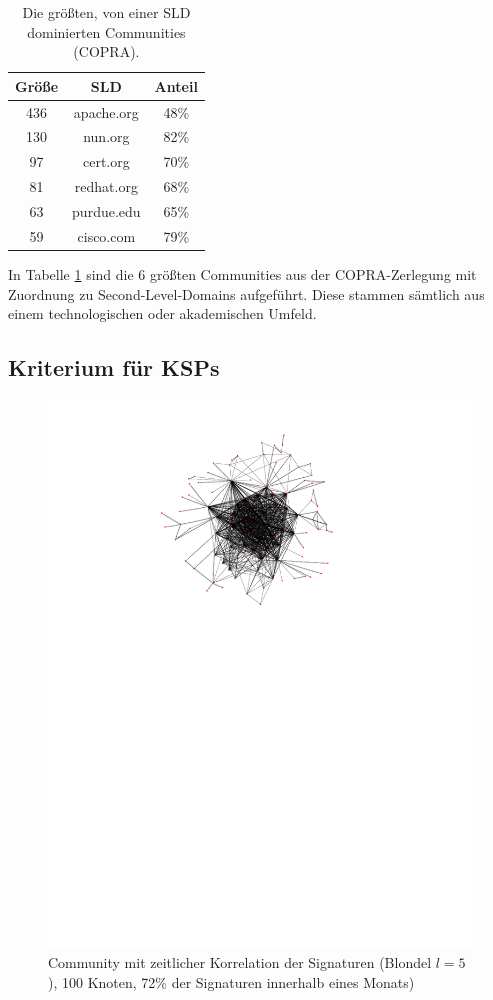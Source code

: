 \begin{table}
  \centering
  \begin{tabular}{c|c|c}
    Größe & SLD & Anteil \\
    \hline
    436 & apache.org & 48\% \\
    130 & nun.org & 82\% \\
    97 & cert.org & 70\% \\
    81 & redhat.org & 68\% \\
    63 & purdue.edu & 65\% \\
    59 & cisco.com & 79\% 
  \end{tabular}
  \caption{Die größten, von einer SLD dominierten Communities
    (COPRA).}
  \label{tab:ass-examples}
\end{table}
In Tabelle \ref{tab:ass-examples} sind die 6 größten Communities
aus der COPRA-Zerlegung mit Zuordnung zu Second-Level-Domains
aufgeführt. Diese stammen sämtlich aus einem technologischen oder
akademischen Umfeld.

\subsection{Kriterium für KSPs}
\label{sec:kriterium-fur-ksps}

\begin{figure}[th!]
  \centering
  \includegraphics[scale=1.5]{images/subgraph-label-time-fa62cc57cd35e9f90b85435efc407ad5.pdf}
  \caption{Community mit zeitlicher Korrelation der Signaturen
    (Blondel $l=5$),
    100 Knoten, 72\% der Signaturen innerhalb eines Monats)}
  \label{fig:time-corr-com-normal}
\end{figure}

